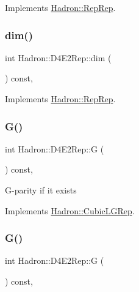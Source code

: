 Implements \mbox{\hyperlink{structHadron_1_1RepRep_a92c8802e5ed7afd7da43ccfd5b7cd92b}{Hadron\+::\+Rep\+Rep}}.

\mbox{\label{structHadron_1_1D4E2Rep_a4c70a287724e1537c34e7795797f2f09}} 
\subsubsection{\texorpdfstring{dim()}{dim()}\hspace{0.1cm}{\footnotesize\ttfamily [3/3]}}
{\footnotesize\ttfamily int Hadron\+::\+D4\+E2\+Rep\+::dim (\begin{DoxyParamCaption}{ }\end{DoxyParamCaption}) const\hspace{0.3cm}{\ttfamily [inline]}, {\ttfamily [virtual]}}



Implements \mbox{\hyperlink{structHadron_1_1RepRep_a92c8802e5ed7afd7da43ccfd5b7cd92b}{Hadron\+::\+Rep\+Rep}}.

\mbox{\label{structHadron_1_1D4E2Rep_a841cd721b6c651b41ffb06fb8641c005}} 
\subsubsection{\texorpdfstring{G()}{G()}\hspace{0.1cm}{\footnotesize\ttfamily [1/2]}}
{\footnotesize\ttfamily int Hadron\+::\+D4\+E2\+Rep\+::G (\begin{DoxyParamCaption}{ }\end{DoxyParamCaption}) const\hspace{0.3cm}{\ttfamily [inline]}, {\ttfamily [virtual]}}

G-\/parity if it exists 

Implements \mbox{\hyperlink{structHadron_1_1CubicLGRep_ace26f7b2d55e3a668a14cb9026da5231}{Hadron\+::\+Cubic\+L\+G\+Rep}}.

\mbox{\label{structHadron_1_1D4E2Rep_a841cd721b6c651b41ffb06fb8641c005}} 
\subsubsection{\texorpdfstring{G()}{G()}\hspace{0.1cm}{\footnotesize\ttfamily [2/2]}}
{\footnotesize\ttfamily int Hadron\+::\+D4\+E2\+Rep\+::G (\begin{DoxyParamCaption}{ }\end{DoxyParamCaption}) const\hspace{0.3cm}{\ttfamily [inline]}, {\ttfamily [virtual]}}

